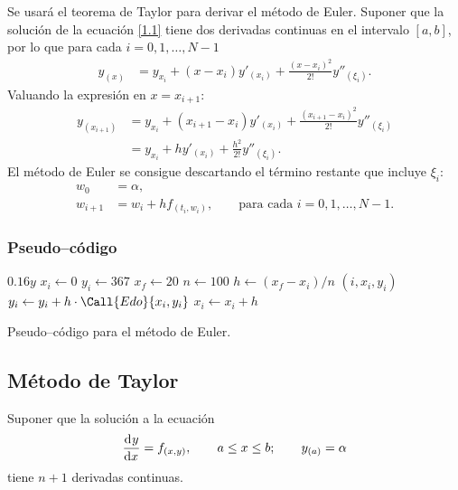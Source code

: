 \documentclass[
    english, spanish, Ce-table, Ce-theorem
]{CabesHW}
\begin{document}
Se usará el teorema de Taylor para derivar el método de Euler. Suponer que la solución de la ecuación  \eqref{1.1} tiene dos derivadas continuas en el intervalo $[a, b]$, por lo que para cada $i = 0, 1, \ldots, N-1$
\begin{align*}
     y_{(x)} &= y_{x_i} + (x-x_i)y'_{(x_i)} + \frac{(x-x_i)^2}{2!}y''_{(\xi_i)}.
\end{align*} 
Valuando la expresión en $x=x_{i+1}$:
\begin{align*}
     y_{(x_{i+1})} &= y_{x_i} + (x_{i+1}-x_i)y'_{(x_i)} + \frac{(x_{i+1}-x_i)^2}{2!}y''_{(\xi_i)}\\
     &= y_{x_i} + hy'_{(x_i)} + \frac{h^2}{2!}y''_{(\xi_i)}.
\end{align*}
El método de Euler se consigue descartando el término restante que incluye $\xi_i$:
\begin{align*}
    w_0 &= \alpha,\\
    w_{i+1} &= w_i + h f_{(t_i, w_i)}, \qquad \text{para cada $i = 0, 1, \ldots, N-1$}.
\end{align*}

\subsubsection{Pseudo--código}
\begin{algorithm}[H]
    \centering
    \begin{myalg}[1]
        \State \Output $0.16 y$
    \EndFunction
    \State \phantom{}
    \State $x_i \gets 0$ 
    \State $y_i \gets 367$ 
    \State $x_f \gets 20$ 
    \State $n \gets 100$ 
    \State \phantom{}
    \State $h \gets (x_f - x_i)/n$ 
        \State \Output $(i, x_i, y_i)$
        \State \phantom{}
        \State $y_i \gets y_i + h\cdot\Call{Edo}{x_i, y_i}$
        \State $x_i \gets x_i + h$
    \EndFor
    \end{myalg}
    \caption{Pseudo--código para el método de Euler.}
    \label{alg:euler}
\end{algorithm}

\vspace{1em}
\subsection{Método de Taylor}
Suponer que la solución a la ecuación
\[ \td{y}{x} = f_{(x,y)}, \qquad a \leq x \leq b; \qquad y_{(a)} = \alpha \]
tiene $n+1$ derivadas continuas.
\end{document}
